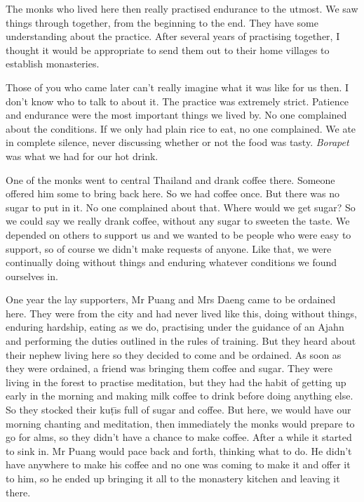 The monks who lived here then really practised endurance to the utmost. We saw things through together, from the beginning to the end. They have some understanding about the practice. After several years of practising together, I thought it would be appropriate to send them out to their home villages to establish monasteries.

Those of you who came later can't really imagine what it was like for us then. I don't know who to talk to about it. The practice was extremely strict. Patience and endurance were the most important things we lived by. No one complained about the conditions. If we only had plain rice to eat, no one complained. We ate in complete silence, never discussing whether or not the food was tasty. \textit{Borapet} was what we had for our hot drink.

One of the monks went to central Thailand and drank coffee there. Some\-one offered him some to bring back here. So we had coffee once. But there was no sugar to put in it. No one complained about that. Where would we get sugar? So we could say we really drank coffee, without any sugar to sweeten the taste. We depended on others to support us and we wanted to be people who were easy to support, so of course we didn't make requests of anyone. Like that, we were continually doing without things and enduring whatever conditions we found ourselves in.

One year the lay supporters, Mr Puang and Mrs Daeng came to be ordained here. They were from the city and had never lived like this, doing without things, enduring hardship, eating as we do, practising under the guidance of an Ajahn and performing the duties outlined in the rules of training. But they heard about their nephew living here so they decided to come and be ordained. As soon as they were ordained, a friend was bringing them coffee and sugar. They were living in the forest to practise meditation, but they had the habit of getting up early in the morning and making milk coffee to drink before doing anything else. So they stocked their ku\d{t}\={\i}s full of sugar and coffee. But here, we would have our morning chanting and meditation, then immediately the monks would prepare to go for alms, so they didn't have a chance to make coffee. After a while it started to sink in. Mr Puang would pace back and forth, thinking what to do. He didn't have anywhere to make his coffee and no one was coming to make it and offer it to him, so he ended up bringing it all to the monastery kitchen and leaving it there.


